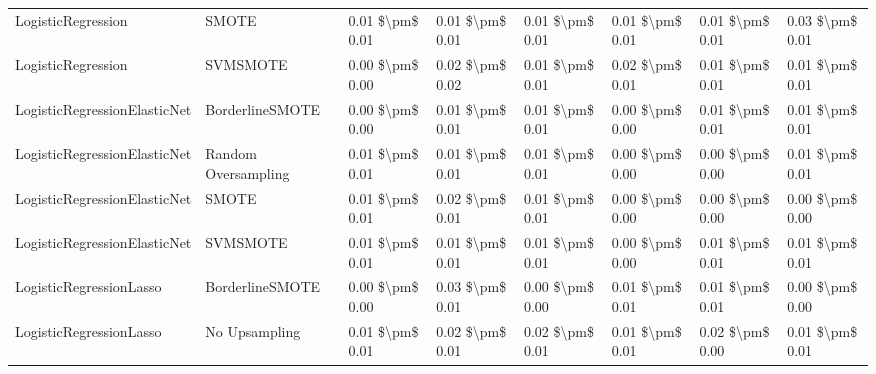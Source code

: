 \begin{tabular}{llllllll}
             LogisticRegression &                         SMOTE & 0.01 \$\textbackslash pm\$ 0.01 &           0.01 \$\textbackslash pm\$ 0.01 &       0.01 \$\textbackslash pm\$ 0.01 &        0.01 \$\textbackslash pm\$ 0.01 &                         0.01 \$\textbackslash pm\$ 0.01 &     0.03 \$\textbackslash pm\$ 0.01 \\
             LogisticRegression &                      SVMSMOTE & 0.00 \$\textbackslash pm\$ 0.00 &           0.02 \$\textbackslash pm\$ 0.02 &       0.01 \$\textbackslash pm\$ 0.01 &        0.02 \$\textbackslash pm\$ 0.01 &                         0.01 \$\textbackslash pm\$ 0.01 &     0.01 \$\textbackslash pm\$ 0.01 \\
   LogisticRegressionElasticNet &               BorderlineSMOTE & 0.00 \$\textbackslash pm\$ 0.00 &           0.01 \$\textbackslash pm\$ 0.01 &       0.01 \$\textbackslash pm\$ 0.01 &        0.00 \$\textbackslash pm\$ 0.00 &                         0.01 \$\textbackslash pm\$ 0.01 &     0.01 \$\textbackslash pm\$ 0.01 \\
   LogisticRegressionElasticNet &           Random Oversampling & 0.01 \$\textbackslash pm\$ 0.01 &           0.01 \$\textbackslash pm\$ 0.01 &       0.01 \$\textbackslash pm\$ 0.01 &        0.00 \$\textbackslash pm\$ 0.00 &                         0.00 \$\textbackslash pm\$ 0.00 &     0.01 \$\textbackslash pm\$ 0.01 \\
   LogisticRegressionElasticNet &                         SMOTE & 0.01 \$\textbackslash pm\$ 0.01 &           0.02 \$\textbackslash pm\$ 0.01 &       0.01 \$\textbackslash pm\$ 0.01 &        0.00 \$\textbackslash pm\$ 0.00 &                         0.00 \$\textbackslash pm\$ 0.00 &     0.00 \$\textbackslash pm\$ 0.00 \\
   LogisticRegressionElasticNet &                      SVMSMOTE & 0.01 \$\textbackslash pm\$ 0.01 &           0.01 \$\textbackslash pm\$ 0.01 &       0.01 \$\textbackslash pm\$ 0.01 &        0.00 \$\textbackslash pm\$ 0.00 &                         0.01 \$\textbackslash pm\$ 0.01 &     0.01 \$\textbackslash pm\$ 0.01 \\
        LogisticRegressionLasso &               BorderlineSMOTE & 0.00 \$\textbackslash pm\$ 0.00 &           0.03 \$\textbackslash pm\$ 0.01 &       0.00 \$\textbackslash pm\$ 0.00 &        0.01 \$\textbackslash pm\$ 0.01 &                         0.01 \$\textbackslash pm\$ 0.01 &     0.00 \$\textbackslash pm\$ 0.00 \\
        LogisticRegressionLasso &                 No Upsampling & 0.01 \$\textbackslash pm\$ 0.01 &           0.02 \$\textbackslash pm\$ 0.01 &       0.02 \$\textbackslash pm\$ 0.01 &        0.01 \$\textbackslash pm\$ 0.01 &                         0.02 \$\textbackslash pm\$ 0.00 &     0.01 \$\textbackslash pm\$ 0.01 \\

\end{tabular}
